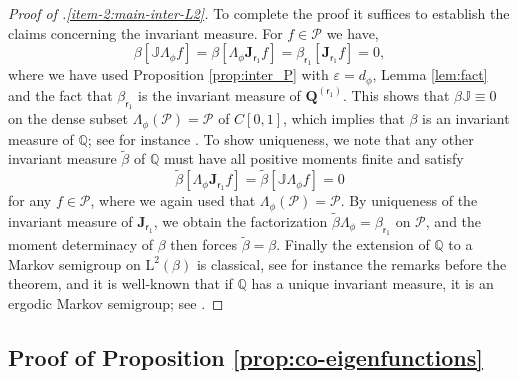 \documentclass[10pt]{amsart}
\let\epsilon\varepsilon
\theoremstyle{plain}
\theoremstyle{definition}
\newcommand{\Poly}{\mathscr{P}}
\newcommand{\J}{\mathds{Q}}
\newcommand{\calJ}{\mathds{J}}
\newcommand{\Leb}{\mathrm{L}}
\newcommand{\calJd}{\mathbf{J}}
\newcommand{\lam}{{\bm{\lambda}_1}}
\newcommand{\vat}{{\mathsf{r}_1}}
\newcommand{\Q}[1][\mo]{\mathbf{Q}^{({#1})}}
\newcommand{\gab}[1][\lam,\mo]{{\beta_{#1}}}
\let\mo\mu
\let\bpsi\beta
\begin{document}
\begin{proof}[Proof of .\eqref{item-2:main-inter-L2}]

To complete the proof it suffices to establish the claims concerning the invariant measure. For $f \in \Poly$ we have,
\[
\bpsi[\calJ \Lambda_{\phi}f] = \bpsi[\Lambda_{\phi}\calJd_{\vat} f] =\gab[\vat] [\calJd_{\vat} f] = 0,
\]
where we have used Proposition \ref{prop:inter_P} with $\epsilon = d_\phi$, Lemma \ref{lem:fact} and the fact that $\gab[\vat]$ is the invariant measure of $\Q[\vat]$. This shows that $\bpsi \calJ \equiv 0$ on the dense subset $\Lambda_{\phi}(\Poly)=\Poly$ of $C[0,1]$, which implies that $\bpsi$ is an invariant measure of $\J$; see for instance \cite[\S 1.4.1]{Bakry_Book}. To show uniqueness, we note that any other invariant measure $\widetilde{\bpsi}$ of $\J$ must have all positive moments finite and satisfy
\begin{equation*}
\widetilde{\bpsi} [ \Lambda_{\phi} \calJd_{\vat} f ] =\widetilde{\bpsi} [ \calJ \Lambda_\phi f ] = 0
\end{equation*}
for any $f \in \Poly$, where we again used that $\Lambda_\phi(\Poly) = \Poly$. By uniqueness of the invariant measure of $\calJd_{\vat}$, we obtain the factorization $\widetilde{\bpsi} \Lambda_{\phi} = \gab[\vat]$ on $\Poly$, and the moment determinacy of $\bpsi$ then forces $\widetilde{\bpsi} = \bpsi$. Finally the extension of $\J$ to a Markov semigroup on $\Leb^2(\bpsi)$ is classical, see for instance the remarks before the theorem, and it is well-known that if $\J$ has a unique invariant measure, it is an ergodic Markov semigroup; see \eg \cite[Th.\,5.16]{da-prato:2006}.
\end{proof}

\subsection{Proof of Proposition \ref{prop:co-eigenfunctions}}
\end{document}
